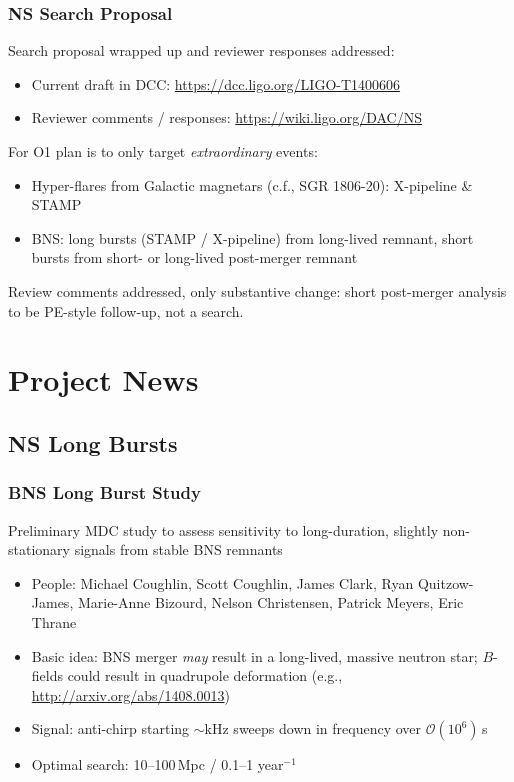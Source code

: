 \documentclass{beamer}
\begin{document}
\begin{frame}
    \frametitle{NS Search Proposal}
    Search proposal wrapped up and reviewer responses addressed:
    \begin{itemize}
        \item Current draft in DCC: {\small \href{https://dcc.ligo.org/LIGO-T1400606}{https://dcc.ligo.org/LIGO-T1400606}}
        \item Reviewer comments / responses: \url{https://wiki.ligo.org/DAC/NS}
    \end{itemize}
    For O1 plan is to only target \emph{extraordinary} events:
    \begin{itemize}
        \item Hyper-flares from Galactic magnetars (c.f., SGR 1806-20):
            X-pipeline \& STAMP
        \item BNS: long bursts (STAMP / X-pipeline) from long-lived remnant,
            short bursts from short- or long-lived post-merger remnant
    \end{itemize}
    Review comments addressed, only substantive change: short post-merger
    analysis to be PE-style follow-up, not a search.
\end{frame}

\section{Project News}

\subsection{NS Long Bursts}
\begin{frame}
    \frametitle{BNS Long Burst Study}
    Preliminary MDC study to assess sensitivity to long-duration, slightly
    non-stationary signals from stable BNS remnants
    \begin{itemize}
        \item People: Michael Coughlin, Scott Coughlin, James Clark, Ryan
            Quitzow-James, Marie-Anne Bizourd, Nelson Christensen, Patrick
            Meyers, Eric Thrane
        \item Basic idea: BNS merger \emph{may} result in a long-lived, massive
            neutron star; $B$-fields could result in quadrupole deformation
            (e.g., \url{http://arxiv.org/abs/1408.0013})
        \item Signal: anti-chirp starting $\sim$kHz sweeps down in frequency
            over $\mathcal{O}(10^6)$\,s
        \item Optimal search: 10--100\,Mpc / 0.1--1 year$^{-1}$
    \end{itemize}
\end{frame}
\end{document}
